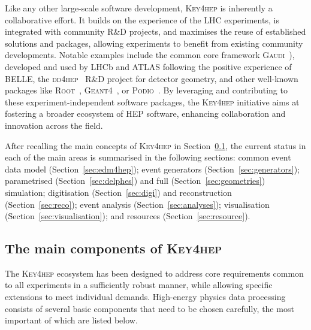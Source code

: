 Like any other large-scale software development, \textsc{Key4hep} is inherently a collaborative effort.
It builds on the experience of the LHC experiments, 
is integrated with community R\&D projects, 
and maximises the reuse of established solutions and packages, 
allowing experiments to benefit from existing community developments.  
Notable examples include the common core framework \textsc{Gaudi}~\cite{Gaudi}), 
developed and used by LHCb and ATLAS following the positive experience of BELLE,
the \textsc{dd4hep}~\cite{dd4hep} R\&D project for detector geometry, 
and other well-known packages like \textsc{Root}~\cite{root}, \textsc{Geant4}~\cite{Geant4}, or \textsc{Podio}~\cite{Podio}. 
By leveraging and contributing to these experiment-independent software packages, 
the \textsc{Key4hep} initiative aims at fostering a broader ecosystem of HEP software,  
enhancing collaboration and innovation across the field.

After recalling the main concepts of \textsc{Key4hep} in Section~\ref{sec:k4h}, the current status in each of the main areas is summarised in the following sections: common event data model (Section~\ref{sec:edm4hep}); event generators (Section~\ref{sec:generators}); parametrised (Section~\ref{sec:delphes}) and full (Section~\ref{sec:geometries}) simulation;  digitisation (Section~\ref{sec:digi}) and reconstruction (Section~\ref{sec:reco});  event analysis (Section~\ref{sec:analyses}); visualisation (Section~\ref{sec:visualisation}); and resources (Section~\ref{sec:resource}).

\subsection{The main components of \textsc{Key4hep}}
\label{sec:k4h}

The \textsc{Key4hep} ecosystem has been designed to address core requirements common to all experiments in a sufficiently robust manner, 
while allowing specific extensions to meet individual demands. 
High-energy physics data processing consists of several basic components that need to be chosen carefully, 
the most important of which are listed below.

